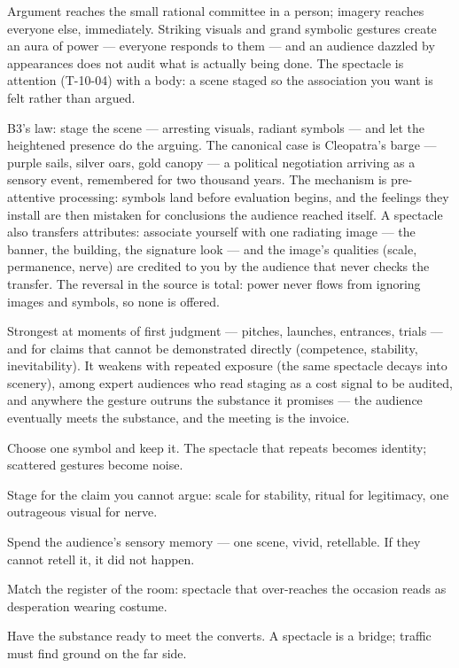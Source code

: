 \begin{core}
Argument reaches the small rational committee in a person; imagery reaches everyone else, immediately. Striking visuals and grand symbolic gestures create an aura of power --- everyone responds to them --- and an audience dazzled by appearances does not audit what is actually being done. The spectacle is attention (T-10-04) with a body: a scene staged so the association you want is felt rather than argued.
\end{core}
\begin{mechanism}
B3's law: stage the scene --- arresting visuals, radiant symbols --- and let the heightened presence do the arguing. The canonical case is Cleopatra's barge --- purple sails, silver oars, gold canopy --- a political negotiation arriving as a sensory event, remembered for two thousand years. The mechanism is pre-attentive processing: symbols land before evaluation begins, and the feelings they install are then mistaken for conclusions the audience reached itself. A spectacle also transfers attributes: associate yourself with one radiating image --- the banner, the building, the signature look --- and the image's qualities (scale, permanence, nerve) are credited to you by the audience that never checks the transfer. The reversal in the source is total: power never flows from ignoring images and symbols, so none is offered.
\end{mechanism}
\begin{conditions}
Strongest at moments of first judgment --- pitches, launches, entrances, trials --- and for claims that cannot be demonstrated directly (competence, stability, inevitability). It weakens with repeated exposure (the same spectacle decays into scenery), among expert audiences who read staging as a cost signal to be audited, and anywhere the gesture outruns the substance it promises --- the audience eventually meets the substance, and the meeting is the invoice.
\end{conditions}
\begin{application}
  \item Choose one symbol and keep it. The spectacle that repeats becomes identity; scattered gestures become noise.
  \item Stage for the claim you cannot argue: scale for stability, ritual for legitimacy, one outrageous visual for nerve.
  \item Spend the audience's sensory memory --- one scene, vivid, retellable. If they cannot retell it, it did not happen.
  \item Match the register of the room: spectacle that over-reaches the occasion reads as desperation wearing costume.
  \item Have the substance ready to meet the converts. A spectacle is a bridge; traffic must find ground on the far side.
\end{application}
